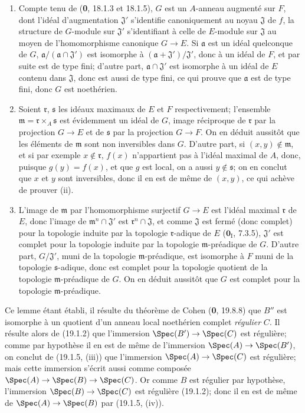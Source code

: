 \begin{enumerate}
  \item[(i)] Compte tenu de (\textbf{0}, 18.1.3 et 18.1.5), $G$ est un $A$-anneau augmenté sur $F$, dont l'idéal d'augmentation $\mathfrak J'$ s'identifie canoniquement au noyau $\mathfrak J$ de $f$, la structure de $G$-module sur $\mathfrak J'$ s'identifiant à celle de $E$-module sur $\mathfrak J$ au moyen de l'homomorphisme canonique $G\to E$. Si $\mathfrak a$ est un idéal quelconque de $G$, $\mathfrak a/(\mathfrak a\cap\mathfrak J')$ est isomorphe à $(\mathfrak a+\mathfrak J')/\mathfrak J'$, donc à un idéal de $F$, et par suite est de type fini; d'autre part, $\mathfrak a\cap\mathfrak J'$ est isomorphe à un idéal de $E$ contenu dans $\mathfrak J$, donc est aussi de type fini, ce qui prouve que $\mathfrak a$ est de type fini, donc $G$ est noethérien.
  \item[(ii)] Soient $\mathfrak r$, $\mathfrak s$ les idéaux maximaux de $E$ et $F$ respectivement; l'ensemble $\mathfrak m=\mathfrak r\times_A\mathfrak s$ est évidemment un idéal de $G$, image réciproque de $\mathfrak r$ par la projection $G\to E$ et de $\mathfrak s$ par la projection $G\to F$. On en déduit aussitôt que les éléments de $\mathfrak m$ sont non inversibles dans $G$. D'autre part, si $(x,y)\notin\mathfrak m$, et si par exemple $x\notin\mathfrak r$, $f(x)$ n'appartient pas à l'idéal maximal de $A$, donc, puisque $g(y)=f(x)$, et que $g$ est local, on a aussi $y\notin\mathfrak s$; on en
conclut que $x$ et $y$ sont inversibles, donc il en est de même de $(x,y)$, ce qui achève de prouver (ii).
  \item[(iii)] L'image de $\mathfrak m$ par l'homomorphisme surjectif $G\to E$ est l'idéal maximal $\mathfrak r$ de $E$, donc l'image de $\mathfrak m^n\cap\mathfrak J'$ est $\mathfrak r^n\cap\mathfrak J$, et comme $\mathfrak J$ est fermé (donc complet) pour la topologie induite par la topologie $\mathfrak r$-adique de $E$ ($\mathbf{0}_{\mathrm I}$, 7.3.5), $\mathfrak J'$ est complet pour la topologie induite par la topologie $\mathfrak m$-préadique de $G$. D'autre part, $G/\mathfrak J'$, muni de la topologie $\mathfrak m$-préadique, est isomorphe à $F$ muni de la topologie $\mathfrak s$-adique, donc est complet pour la topologie quotient de la topologie $\mathfrak m$-préadique de $G$. On en déduit aussitôt que $G$ est complet pour la topologie $\mathfrak m$-préadique.
\end{enumerate}

Ce lemme étant établi, il résulte du théorème de Cohen (\textbf{0}, 19.8.8) que $B''$ est isomorphe à un quotient d'un anneau local noethérien complet \emph{régulier} $C$. Il résulte alors de (19.1.2) que l'immersion $\Spec(B')\to\Spec(C)$ est régulière; comme par hypothèse il en est de même de l'immersion $\Spec(A)\to\Spec(B')$, on conclut de (19.1.5, (iii)) que l'immersion $\Spec(A)\to\Spec(C)$ est régulière; mais cette immersion s'écrit aussi comme composée $\Spec(A)\to\Spec(B)\to\Spec(C)$. Or comme $B$ est régulier par hypothèse, l'immersion $\Spec(B)\to\Spec(C)$ est régulière (19.1.2); donc il en est de même de $\Spec(A)\to\Spec(B)$ par (19.1.5, (iv)).

